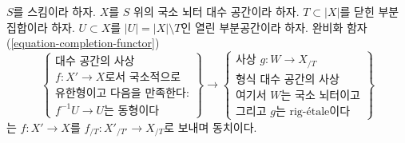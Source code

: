\begin{theorem}
\label{theorem-dilatations-general}
$S$를 스킴이라 하자. $X$를 $S$ 위의 국소 뇌터 대수 공간이라 하자.
$T \subset |X|$를 닫힌 부분집합이라 하자.
$U \subset X$를 $|U| = |X| \setminus T$인 열린 부분공간이라 하자.
완비화 함자 (\ref{equation-completion-functor})
$$
\left\{
\begin{matrix}
\text{대수 공간의 사상}\\
f : X' \to X\text{로서 국소적으로}\\
\text{유한형이고 다음을 만족한다:}\\
f^{-1}U \to U\text{는 동형이다}
\end{matrix}
\right\}
\longrightarrow
\left\{
\begin{matrix}
\text{사상 }g : W \to X_{/T}\\
\text{형식 대수 공간의 사상}\\
\text{여기서 }W\text{는 국소 뇌터이고}\\
\text{그리고 }g\text{는 rig-\'etale이다}
\end{matrix}
\right\}
$$
는 $f : X' \to X$를
$f_{/T} : X'_{/T'} \to X_{/T}$로 보내며 동치이다.
\end{theorem}

